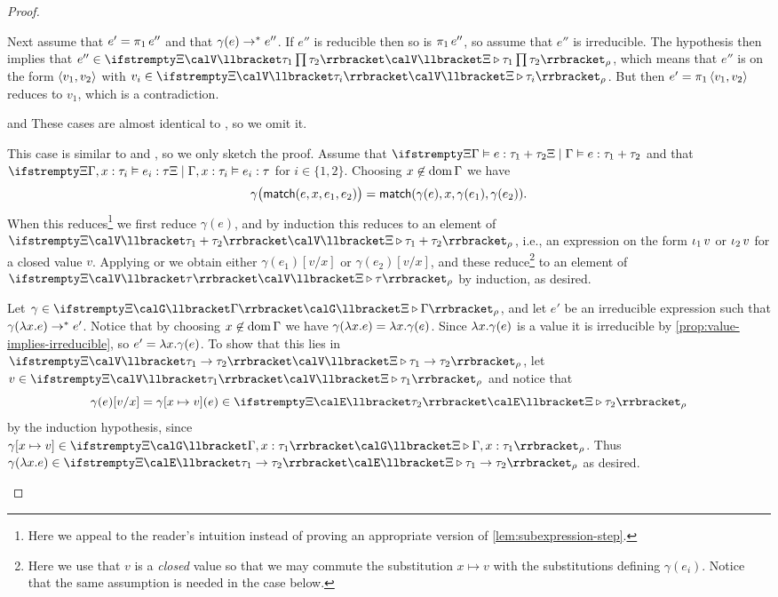 \begin{proof}
\begin{proofsec*}
    Next assume that $e' = \expProjl{e''}$ and that $\gamma(e) \to^* e''$. If $e''$ is reducible then so is $\expProjl{e''}$, so assume that $e''$ is irreducible. The hypothesis then implies that $e'' \in \valInt{\Xi}{\typeProd{\tau_1}{\tau_2}}{\rho}$, which means that $e''$ is on the form $\langle\textcolor{black}{v_1},\textcolor{black}{v_2}\rangle$ with $v_i \in \valInt{\Xi}{\tau_i}{\rho}$. But then $e' = \expProjl{\expPair{v_1}{v_2}}$ reduces to $v_1$, which is a contradiction.

    \item[\ruleref{Tinjl} and \ruleref{Tinjr}]
    These cases are almost identical to , so we omit it.

    \item[\ruleref{Tmatch}]
    This case is similar to  and , so we only sketch the proof. Assume that $\semtype{\Xi}{\Gamma}{e}{\typeSum{\tau_1}{\tau_2}}$ and that $\semtype{\Xi}{\Gamma, \hastype{x}{\tau_i}}{e_i}{\tau}$ for $i \in \{1,2\}$. Choosing $x \not\in \operatorname{dom}{\Gamma}$ we have
    \begin{equation*}
        \gamma \bigl( \mathsf{match}(e,x,e_1,e_2) \bigr)
            = \mathsf{match}(\gamma(e),x,\gamma(e_1),\gamma(e_2)).
    \end{equation*}
    When this reduces\footnote{Here we appeal to the reader's intuition instead of proving an appropriate version of \cref{lem:subexpression-step}.} we first reduce $\gamma(e)$, and by induction this reduces to an element of $\valInt{\Xi}{\typeSum{\tau_1}{\tau_2}}{\rho}$, i.e., an expression on the form $\expInjl{v}$ or $\expInjr{v}$ for a closed value $v$. Applying  or  we obtain either $\gamma(e_1)[v/x]$ or $\gamma(e_2)[v/x]$, and these reduce\footnote{Here we use that $v$ is a \emph{closed} value so that we may commute the substitution $x \mapsto v$ with the substitutions defining $\gamma(e_i)$. Notice that the same assumption is needed in the case  below.} to an element of $\valInt{\Xi}{\tau}{\rho}$ by induction, as desired.

    \item[\ruleref{Tlam}]
    Let $\gamma \in \conInt{\Xi}{\Gamma}{\rho}$, and let $e'$ be an irreducible expression such that $\gamma(\expLam{x}{e}) \step^* e'$. Notice that by choosing $x \not\in \operatorname{dom}{\Gamma}$ we have $\gamma(\expLam{x}{e}) = \expLam{x}{\gamma(e)}$. Since $\expLam{x}{\gamma(e)}$ is a value it is irreducible by \cref{prop:value-implies-irreducible}, so $e' = \expLam{x}{\gamma(e)}$. To show that this lies in $\valInt{\Xi}{\typeFunc{\tau_1}{\tau_2}}{\rho}$, let $v \in \valInt{\Xi}{\tau_1}{\rho}$ and notice that
    \begin{equation*}
        \gamma(e)[v/x]
            = \gamma[x \mapsto v](e)
            \in \expInt{\Xi}{\tau_2}{\rho}
    \end{equation*}
    by the induction hypothesis, since $\gamma[x \mapsto v] \in \conInt{\Xi}{\Gamma, \hastype{x}{\tau_1}}{\rho}$. Thus $\gamma(\expLam{x}{e}) \in \expInt{\Xi}{\typeFunc{\tau_1}{\tau_2}}{\rho}$ as desired.


\end{proofsec*}
\end{proof}
